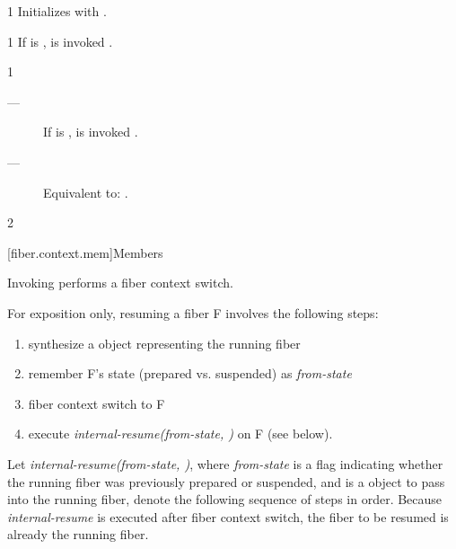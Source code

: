 
1 \effects
Initializes  with .


1 \effects
If  is \false,  is invoked .


1 \effects
\begin{description}
    \item[---] If  is \false,  is invoked .
    \item[---] Equivalent to: .
\end{description}

2 \returns
\this

[fiber.context.mem]{Members}

Invoking \resumewith performs a fiber context switch.

For exposition only, resuming a fiber F involves the following steps:

\begin{enumerate}
    \item synthesize a \fiber object  representing the running fiber
    \item remember F's state (prepared vs. suspended) as \emph{from-state}
    \item fiber context switch to F
    \item execute \emph{internal-resume(from-state, )} on F (see below).
\end{enumerate}

Let \emph{internal-resume(from-state, )}, where \emph{from-state}
is a flag indicating whether the running fiber was previously prepared or
suspended, and  is a \fiber object to pass into the running fiber,
denote the following sequence of steps in order.
Because \emph{internal-resume} is executed after fiber context switch, the
fiber to be resumed is already the running fiber.

